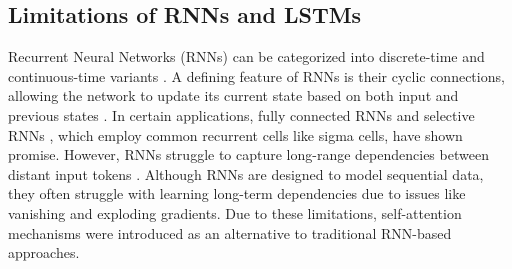 \subsection{Limitations of RNNs and LSTMs}  
Recurrent Neural Networks (RNNs) can be categorized into discrete-time and continuous-time variants \cite{grossberg2013}. A defining feature of RNNs is their cyclic connections, allowing the network to update its current state based on both input and previous states \cite{salehinejad2017}. In certain applications, fully connected RNNs \cite{elman1990} and selective RNNs \cite{ster2013}, which employ common recurrent cells like sigma cells, have shown promise. However, RNNs struggle to capture long-range dependencies between distant input tokens \cite{ster2013}. Although RNNs are designed to model sequential data, they often struggle with learning long-term dependencies due to issues like vanishing and exploding gradients. Due to these limitations, self-attention mechanisms were introduced as an alternative to traditional RNN-based approaches.

